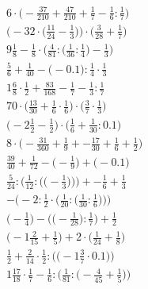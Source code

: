\documentclass[8pt]{article}
\begin{document}
\begin{align}
6 \cdot \big(-\frac{37}{210} + \frac{47}{210} + \frac{1}{7} - \frac{1}{6} : \frac{1}{7}\big) \\
\Big(-32 \cdot \big(\frac{11}{24} - \frac{1}{3}\big)\Big) \cdot \Big(\frac{3}{28} + \frac{1}{7}\Big) \\
9\frac{1}{8} - \frac{1}{8} \cdot \Big(\frac{4}{81} : \big(\frac{1}{36} : \frac{1}{4}\big) - \frac{1}{3}\Big) \\
\frac{5}{6} + \frac{1}{40} - \big(-0.1\big) : \frac{1}{4} \cdot \frac{1}{3} \\
1\frac{6}{8} \cdot \frac{1}{2} + \frac{83}{168} - \frac{1}{7} - \frac{1}{3} : \frac{1}{7} \\
70 \cdot \big(\frac{13}{30} + \frac{1}{6} \cdot \frac{1}{6}\big) \cdot \big(\frac{3}{7} \cdot \frac{1}{3}\big) \\
\big(-2\frac{1}{2} - \frac{1}{2}\big) \cdot \big(\frac{1}{6} + \frac{1}{30} : 0.1\big) \\
8 \cdot \big(-\frac{31}{360} + \frac{1}{9} + -\frac{17}{30} + \frac{1}{6} + \frac{1}{2}\big) \\
\frac{39}{40} + \frac{1}{72} - \big(-\frac{1}{9}\big) + \big(-0.1\big) \\
\frac{5}{24} : \bigg(\frac{1}{12} : \Big(\big(-\frac{1}{3}\big)\Big)\bigg) + -\frac{1}{6} + \frac{1}{3} \\
-\bigg(-2 : \frac{1}{2} \cdot \Big(\frac{1}{20} : \big(\frac{1}{30} : \frac{1}{6}\big)\Big)\bigg) \\
\Big(-\frac{1}{4}\Big) - \Big(\big(-\frac{1}{28}\big) : \frac{1}{7}\Big) + \frac{1}{2} \\
\big(-1\frac{2}{15} + \frac{1}{5}\big) + 2 \cdot \big(\frac{1}{24} + \frac{1}{8}\big) \\
\frac{1}{2} + \frac{2}{14} \cdot \frac{1}{2} : \Big(\big(-1\frac{3}{7} \cdot 0.1\big)\Big) \\
1\frac{17}{18} \cdot \frac{1}{7} - \frac{1}{6} : \Big(\frac{1}{81} : \big(-\frac{4}{45} + \frac{1}{5}\big)\Big)
\end{align}
\end{document}
